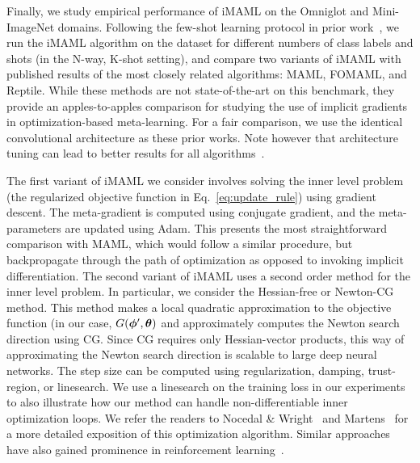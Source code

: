 \documentclass{article} \usepackage[nonatbib, final]{mod_neurips}
\newcommand{\prior}{{\bm{\theta}}}               \newcommand{\priorspace}{\Theta}
\begin{document}
Finally, we study empirical performance of iMAML on the Omniglot and Mini-ImageNet domains.
Following the few-shot learning protocol in prior work~\cite{matchingnets}, we run the iMAML algorithm on the dataset for different numbers of class labels and shots (in the N-way, K-shot setting), and compare two variants of iMAML with published results of the most closely related algorithms: MAML, FOMAML, and Reptile. While these methods are not state-of-the-art on this benchmark, they provide an apples-to-apples comparison for studying the use of implicit gradients in optimization-based meta-learning. For a fair comparison, we use the identical convolutional architecture as these prior works. Note however that architecture tuning can lead to better results for all algorithms~\cite{autometa}.

The first variant of iMAML we consider involves solving the inner level problem (the regularized objective function in Eq.~\ref{eq:update_rule}) using gradient descent. The meta-gradient is computed using conjugate gradient, and the meta-parameters are updated using Adam. This presents the most straightforward comparison with MAML, which would follow a similar procedure, but backpropagate through the path of optimization as opposed to invoking implicit differentiation.
The second variant of iMAML uses a second order method for the inner level problem. In particular, we consider the Hessian-free or Newton-CG~\cite{NocedalBook, Martens2010DeepLV} method. This method makes a local quadratic approximation to the objective function (in our case, $G(\dparam, \prior)$ and approximately computes the Newton search direction using CG. Since CG requires only Hessian-vector products, this way of approximating the Newton search direction is scalable to large deep neural networks. 
The step size can be computed using regularization, damping, trust-region, or linesearch. We use a linesearch on the training loss in our experiments to also illustrate how our method can handle non-differentiable inner optimization loops. We refer the readers to Nocedal \& Wright~\cite{NocedalBook} and Martens~\cite{Martens2010DeepLV} for a more detailed exposition of this optimization algorithm. Similar approaches have also gained prominence in reinforcement learning~\cite{trpo, Rajeswaran17nips}.
\end{document}
